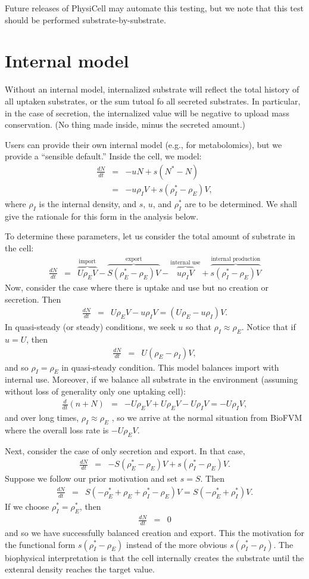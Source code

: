 \documentclass[11point]{article}
\newcommand{\beq}{\begin{eqnarray}}
\newcommand{\eeq}{\end{eqnarray}}
\begin{document}
Future releases of PhysiCell may automate this testing, but we note that this test should be performed 
substrate-by-substrate. 

\section{Internal model}
Without an internal model, internalized substrate will reflect the total history of 
all uptaken substrates, or the sum tutoal fo all secreted substrates.  In particular, 
in the case of secretion, the internalized value will be negative to upload mass conservation. (No thing made inside, minus the secreted amount.) 

Users can provide their own internal model (e.g., for metabolomics), but we provide a ``sensible default.'' Inside the cell, we model: 
\beq
\frac{dN}{dt} & = & -u N + s ( N^* -  N) \\
& = & 
-u \rho_I V + s( \rho_I^* - \rho_E ) V, 
\eeq
where $\rho_I$ is the internal density, and $s$, $u$, and $\rho_I^*$ are to be determined. We shall give the rationale for this form in the analysis below. 

To determine these parameters, let us consider the total amount of substrate in the cell: 
\beq
\frac{dN}{dt} & =& 
\overbrace{ U \rho_E V  }^\textrm{import} 
- 
\overbrace{ S \left( \rho_E^* - \rho_E \right) V }^\textrm{export} 
- 
\overbrace{ u \rho_I V }^\textrm{internal use} 
+ 
\overbrace{ s \left( \rho_I^* - \rho_E \right)V  }^\textrm{internal production}
\eeq
Now, consider the case where there is uptake and use but no creation or secretion. Then 
\beq
\frac{dN}{dt} & = & 
U\rho_E V - u \rho_I V = \left( U \rho_E - u \rho_I \right) V. 
\eeq
In quasi-steady (or steady) conditions, we seek $u$ so that 
$\rho_I \approx \rho_E$. Notice that if $u = U$, then 
\beq
\frac{dN}{dt}  & = & U \left( \rho_E - \rho_I \right) V, 
\eeq
and so $\rho_I = \rho_E$ in quasi-steady condition. This model 
balances import with internal use. Moreover, if we balance all substrate in the 
environment (assuming without loss of generality only one uptaking cell): 
\beq
\frac{d}{dt} \left( n + N \right) & = &
- U \rho_E V + U \rho_E V - U \rho_I V = - U \rho_I V, 
\eeq
and over long times, $\rho_I \approx \rho_E$ , so we arrive at the 
normal situation from BioFVM where the overall loss rate is 
$- U \rho_E V$. 

Next, consider the case of only secretion and export. In that case, 
\beq
\frac{dN}{dt} & = & 
-S ( \rho_E^* - \rho_E ) V + s ( \rho_I^* - \rho_E) V. 
\eeq
Suppose we follow our prior motivation and set $s = S$. Then 
\beq
\frac{dN}{dt} & = & 
S \left( - \rho_E^*  + \rho_E + \rho_I^* - \rho_E \right) V 
= S \left( -\rho_E^* + \rho_I^* \right)V . 
\eeq
If we choose $\rho_I^* = \rho_E^*$, then 
\beq
\frac{dN}{dt} &  = & 0
\eeq
and so we have successfully balanced creation and export. This the 
motivation for the functional form $s ( \rho_I^* - \rho_E)$ instead 
of the more obvious $s ( \rho_I^* - \rho_I)$. The biophysical interpretation 
is that the cell internally creates the substrate until the extenral density 
reaches the target value. 
\end{document}
